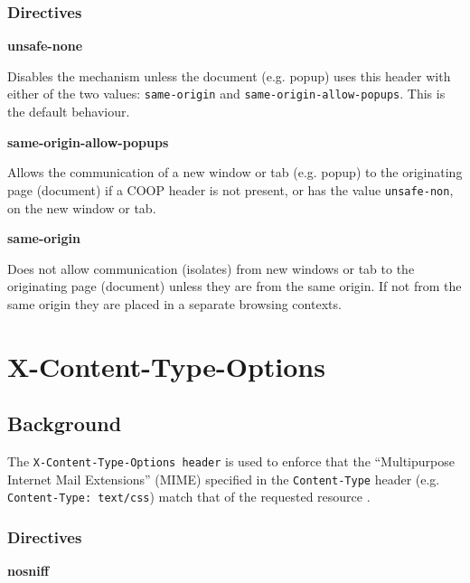 \documentclass{mscreport}
\begin{document}
\subsubsection{Directives}
\textbf{unsafe-none}

\vspace{0.3cm} \noindent
Disables the mechanism unless the document (e.g. popup) uses this header with either of the two values: \texttt{same-origin} and \texttt{same-origin-allow-popups}. This is the default behaviour.

\vspace{0.7cm} \noindent
\textbf{same-origin-allow-popups}

\vspace{0.3cm} \noindent
Allows the communication of a new window or tab (e.g. popup) to the originating page (document) if a COOP header is not present, or has the value \texttt{unsafe-non}, on the new window or tab.

\vspace{0.7cm} \noindent
\textbf{same-origin}

\vspace{0.3cm} \noindent
Does not allow communication (isolates) from new windows or tab to the originating page (document) unless they are from the same origin. If not from the same origin they are placed in a separate browsing contexts.

\newpage


\section{X-Content-Type-Options}
\label{section:xcto}

\subsection{Background}

The \texttt{X-Content-Type-Options header} is used to enforce that the ``Multipurpose Internet Mail Extensions'' (MIME) specified in the \texttt{Content-Type} header (e.g. \newline 
\texttt{Content-Type: text/css}) match that of the requested resource \cite{Apple_undated-hz}.

\subsubsection{Directives}

\textbf{nosniff}
\end{document}
